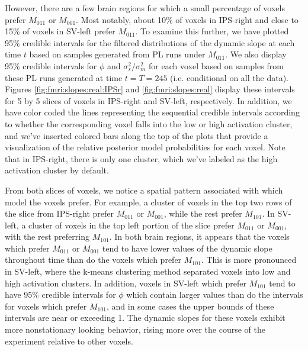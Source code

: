 However, there are a few brain regions for which a small percentage of voxels prefer $M_{011}$ or $M_{001}$. Most notably, about 10\% of voxels in IPS-right and close to 15\% of voxels in SV-left prefer $M_{011}$. To examine this further, we have plotted 95\% credible intervals for the filtered distributions of the dynamic slope at each time $t$ based on samples generated from PL runs under $M_{011}$. We also display 95\% credible intervals for $\phi$ and $\sigma^2_s / \sigma^2_m$ for each voxel based on samples from these PL runs generated at time $t = T = 245$ (i.e. conditional on all the data). Figures \ref{fig:fmri:slopes:real:IPSr} and \ref{fig:fmri:slopes:real} display these intervals for 5 by 5 slices of voxels in IPS-right and SV-left, respectively. In addition, we have color coded the lines representing the sequential credible intervals according to whether the corresponding voxel falls into the low or high activation cluster, and we've inserted colored bars along the top of the plots that provide a visualization of the relative posterior model probabilities for each voxel. Note that in IPS-right, there is only one cluster, which we've labeled as the high activation cluster by default.

From both slices of voxels, we notice a spatial pattern associated with which model the voxels prefer. For example, a cluster of voxels in the top two rows of the slice from IPS-right prefer $M_{011}$ or $M_{001}$, while the rest prefer $M_{101}$. In SV-left, a cluster of voxels in the top left portion of the slice prefer $M_{011}$ or $M_{001}$, with the rest preferring $M_{101}$. In both brain regions, it appears that the voxels which prefer $M_{011}$ or $M_{001}$ tend to have lower values of the dynamic slope throughout time than do the voxels which prefer $M_{101}$. This is more pronounced in SV-left, where the k-means clustering method separated voxels into low and high activation clusters. In addition, voxels in SV-left which prefer $M_{101}$ tend to have 95\% credible intervals for $\phi$ which contain larger values than do the intervals for voxels which prefer $M_{101}$, and in some cases the upper bounds of these intervals are near or exceeding 1. The dynamic slopes for these voxels exhibit more nonstationary looking behavior, rising more over the course of the experiment relative to other voxels.


